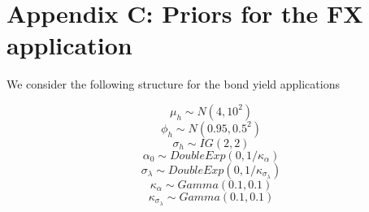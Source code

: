 \documentclass{article}
\begin{document}
\clearpage
\section*{Appendix C: Priors for the FX application}

We consider the following structure for the bond yield applications 

$$ \mu_h \sim N(4,10^2)$$
$$ \phi_h \sim N(0.95,0.5^2)$$
$$ \sigma_h \sim IG(2,2) $$
$$ \alpha_0 \sim DoubleExp(0,1/\kappa_{\alpha})$$
$$ \sigma_{\lambda} \sim DoubleExp(0,1/\kappa_{\sigma_{\lambda}})$$
$$ \kappa_{\alpha} \sim Gamma(0.1, 0.1) $$
$$ \kappa_{\sigma_{\lambda}}\sim Gamma(0.1, 0.1) $$
\end{document}

